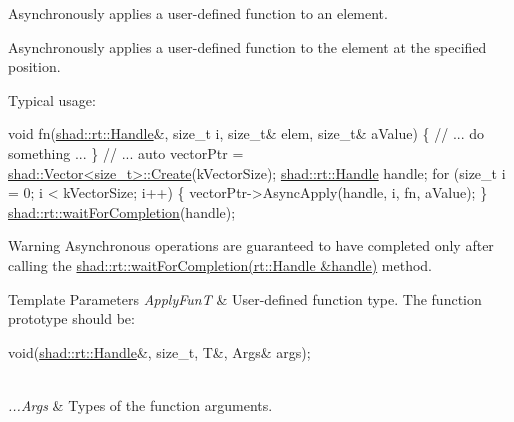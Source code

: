 Asynchronously applies a user-\/defined function to an element. 

Asynchronously applies a user-\/defined function to the element at the specified position.

Typical usage\-: 
\begin{DoxyCode}
\textcolor{keywordtype}{void} fn(\hyperlink{classshad_1_1rt_1_1Handle}{shad::rt::Handle}&, \textcolor{keywordtype}{size\_t} i, \textcolor{keywordtype}{size\_t}& elem, \textcolor{keywordtype}{size\_t}& aValue) \{
  \textcolor{comment}{// ... do something ...}
\}
\textcolor{comment}{// ...}
\textcolor{keyword}{auto} vectorPtr = \hyperlink{classshad_1_1AbstractDataStructure_a31b56084146be9afeb69a2b14970aba1}{shad::Vector<size\_t>::Create}(kVectorSize);
\hyperlink{classshad_1_1rt_1_1Handle}{shad::rt::Handle} handle;
\textcolor{keywordflow}{for} (\textcolor{keywordtype}{size\_t} i = 0; i < kVectorSize; i++) \{
  vectorPtr->AsyncApply(handle, i, fn, aValue);
\}
\hyperlink{namespaceshad_1_1rt_a6ea1d3672bac3a80032863b6732a0c0a}{shad::rt::waitForCompletion}(handle);
\end{DoxyCode}


\begin{DoxyWarning}{Warning}
Asynchronous operations are guaranteed to have completed only after calling the \hyperlink{namespaceshad_1_1rt_a6ea1d3672bac3a80032863b6732a0c0a}{shad\-::rt\-::wait\-For\-Completion(rt\-::\-Handle \&handle)} method.
\end{DoxyWarning}

\begin{DoxyTemplParams}{Template Parameters}
{\em Apply\-Fun\-T} & User-\/defined function type. The function prototype should be\-: 
\begin{DoxyCode}
void(\hyperlink{classshad_1_1rt_1_1Handle}{shad::rt::Handle}&, \textcolor{keywordtype}{size\_t}, T&, Args& args);
\end{DoxyCode}
 \\
\hline
{\em ...\-Args} & Types of the function arguments.\\
\hline
\end{DoxyTemplParams}

